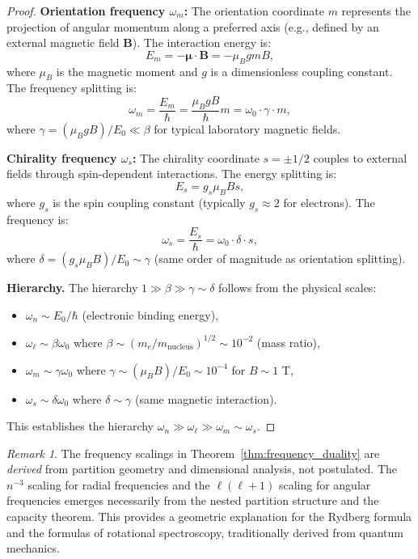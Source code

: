 \documentclass[twocolumn,10pt,a4paper]{article}
\theoremstyle{remark}
\newtheorem{remark}[theorem]{Remark}
\begin{document}
\begin{proof}
\textbf{Orientation frequency $\omega_m$:} The orientation coordinate $m$ represents the projection of angular momentum along a preferred axis (e.g., defined by an external magnetic field $\mathbf{B}$). The interaction energy is:
\begin{equation}
E_m = -\boldsymbol{\mu} \cdot \mathbf{B} = -\mu_B g m B,
\end{equation}
where $\mu_B$ is the magnetic moment and $g$ is a dimensionless coupling constant. The frequency splitting is:
\begin{equation}
\omega_m = \frac{E_m}{\hbar} = \frac{\mu_B g B}{\hbar} m = \omega_0 \cdot \gamma \cdot m,
\end{equation}
where $\gamma = (\mu_B g B) / E_0 \ll \beta$ for typical laboratory magnetic fields.

\textbf{Chirality frequency $\omega_s$:} The chirality coordinate $s = \pm 1/2$ couples to external fields through spin-dependent interactions. The energy splitting is:
\begin{equation}
E_s = g_s \mu_B B s,
\end{equation}
where $g_s$ is the spin coupling constant (typically $g_s \approx 2$ for electrons). The frequency is:
\begin{equation}
\omega_s = \frac{E_s}{\hbar} = \omega_0 \cdot \delta \cdot s,
\end{equation}
where $\delta = (g_s \mu_B B) / E_0 \sim \gamma$ (same order of magnitude as orientation splitting).

\textbf{Hierarchy.} The hierarchy $1 \gg \beta \gg \gamma \sim \delta$ follows from the physical scales:
\begin{itemize}[noitemsep]
    \item $\omega_n \sim E_0/\hbar$ (electronic binding energy),
    \item $\omega_\ell \sim \beta \omega_0$ where $\beta \sim (m_e/m_{\text{nucleus}})^{1/2} \sim 10^{-2}$ (mass ratio),
    \item $\omega_m \sim \gamma \omega_0$ where $\gamma \sim (\mu_B B)/E_0 \sim 10^{-4}$ for $B \sim 1$ T,
    \item $\omega_s \sim \delta \omega_0$ where $\delta \sim \gamma$ (same magnetic interaction).
\end{itemize}
This establishes the hierarchy $\omega_n \gg \omega_\ell \gg \omega_m \sim \omega_s$.
\end{proof}

\begin{remark}
The frequency scalings in Theorem~\ref{thm:frequency_duality} are \emph{derived} from partition geometry and dimensional analysis, not postulated. The $n^{-3}$ scaling for radial frequencies and the $\ell(\ell+1)$ scaling for angular frequencies emerges necessarily from the nested partition structure and the capacity theorem. This provides a geometric explanation for the Rydberg formula and the formulas of rotational spectroscopy, traditionally derived from quantum mechanics.
\end{remark}
\end{document}

